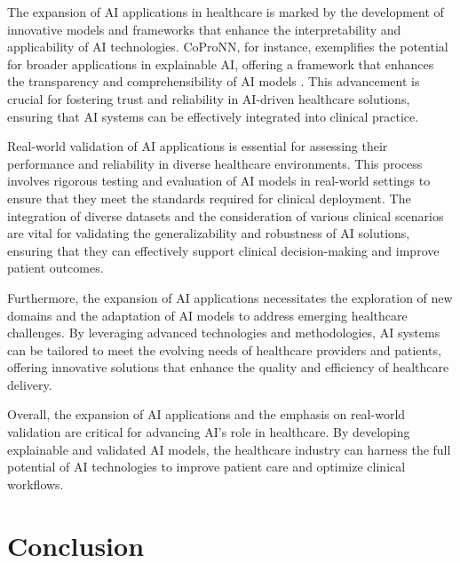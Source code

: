 The expansion of AI applications in healthcare is marked by the development of innovative models and frameworks that enhance the interpretability and applicability of AI technologies. CoProNN, for instance, exemplifies the potential for broader applications in explainable AI, offering a framework that enhances the transparency and comprehensibility of AI models \cite{chiaburu2024copronnconceptbasedprototypicalnearest}. This advancement is crucial for fostering trust and reliability in AI-driven healthcare solutions, ensuring that AI systems can be effectively integrated into clinical practice.



Real-world validation of AI applications is essential for assessing their performance and reliability in diverse healthcare environments. This process involves rigorous testing and evaluation of AI models in real-world settings to ensure that they meet the standards required for clinical deployment. The integration of diverse datasets and the consideration of various clinical scenarios are vital for validating the generalizability and robustness of AI solutions, ensuring that they can effectively support clinical decision-making and improve patient outcomes.



Furthermore, the expansion of AI applications necessitates the exploration of new domains and the adaptation of AI models to address emerging healthcare challenges. By leveraging advanced technologies and methodologies, AI systems can be tailored to meet the evolving needs of healthcare providers and patients, offering innovative solutions that enhance the quality and efficiency of healthcare delivery.



Overall, the expansion of AI applications and the emphasis on real-world validation are critical for advancing AI's role in healthcare. By developing explainable and validated AI models, the healthcare industry can harness the full potential of AI technologies to improve patient care and optimize clinical workflows.








\section{Conclusion} \label{sec:Conclusion}







